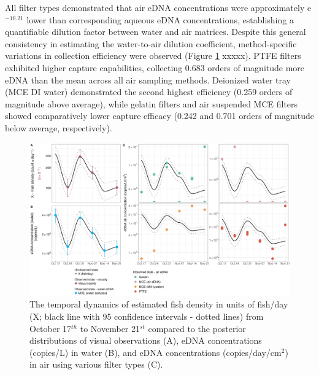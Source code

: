 \documentclass{article}
\begin{document}
All filter types demonstrated that air eDNA concentrations were approximately e$^{-10.21}$ lower than corresponding aqueous eDNA concentrations, establishing a quantifiable dilution factor between water and air matrices. Despite this general consistency in estimating the water-to-air dilution coefficient, method-specific variations in collection efficiency were observed (Figure \ref{fig:fig2} xxxxx). PTFE filters exhibited higher capture capabilities, collecting 0.683 orders of magnitude more eDNA than the mean across all air sampling methods. Deionized water tray (MCE DI water) demonstrated the second highest efficiency (0.259 orders of magnitude above average), while gelatin filters and air suspended MCE filters showed comparatively lower capture efficacy (0.242 and 0.701 orders of magnitude below average, respectively).

\begin{figure}[tbhp] 
\centering
\includegraphics[width=16.5cm]{Plots/Figure_1.jpg}  
\caption{The temporal dynamics of estimated fish density in units of fish/day (X; black line with 95 confidence intervals - dotted lines) from October 17$^{th}$ to November 21$^{st}$ compared to the posterior distributions of visual observations (A), eDNA concentrations (copies/L) in water (B), and eDNA concentrations (copies/day/cm$^2$) in air using various filter types (C).}
\label{fig:fig2}
\end{figure}

\end{document}
